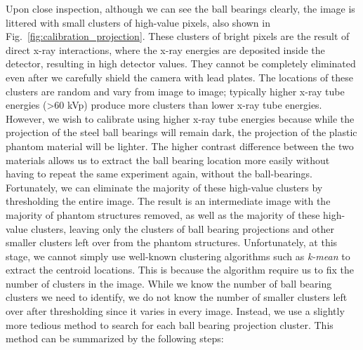 Upon close inspection, although we can see the ball bearings clearly, the image is littered with small clusters of high-value pixels, also shown in Fig.~\ref{fig:calibration_projection}.  These clusters of bright pixels are the result of direct x-ray interactions, where the x-ray energies are deposited inside the detector, resulting in high detector values.  They cannot be completely eliminated even after we carefully shield the camera with lead plates.  The locations of these clusters are random and vary from image to image; typically higher x-ray tube energies (>60 kVp) produce more clusters than lower x-ray tube energies.  However, we wish to calibrate using higher x-ray tube energies because while the projection of the steel ball bearings will remain dark, the projection of the plastic phantom material will be lighter.  The higher contrast difference between the two materials allows us to extract the ball bearing location more easily without having to repeat the same experiment again, without the ball-bearings.  Fortunately, we can eliminate the majority of these high-value clusters by thresholding the entire image.  The result is an intermediate image with the majority of phantom structures removed, as well as the majority of these high-value clusters, leaving only the clusters of ball bearing projections and other smaller clusters left over from the phantom structures.  Unfortunately, at this stage, we cannot simply use well-known clustering algorithms such as \textit{k-mean} to extract the centroid locations.  This is because the algorithm require us to fix the number of clusters in the image.  While we know the number of ball bearing clusters we need to identify, we do not know the number of smaller clusters left over after thresholding since it varies in every image.  Instead, we use a slightly more tedious method to search for each ball bearing projection cluster.  This method can be summarized by the following steps:
%
